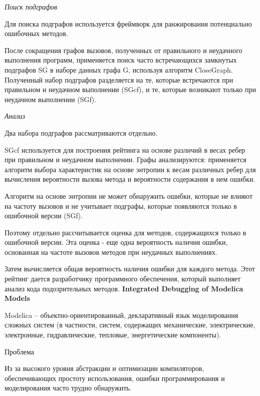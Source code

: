 \textit{Поиск подграфов}

Для поиска подграфов используется фреймворк для ранжирования потенциально ошибочных методов.

После сокращения графов вызовов, полученных от правильного и неудачного выполнения программ, применяется поиск часто встречающихся замкнутых подграфов SG в наборе данных графа G, используя алгоритм CloseGraph. Полученный набор подграфов разделяется на те, которые встречаются при правильном и неудачном выполнении (SGcf), и те, которые возникают только при неудачном выполнении (SGf).
\newline

\textit{Анализ}

Два набора подграфов рассматриваются отдельно.

SGcf используется для построения рейтинга на основе различий в весах ребер при правильном и неудачном выполнении. Графы анализируются: применяется алгоритм выбора характеристик на основе энтропии к весам различных ребер для вычисления вероятности вызова метода и вероятности содержания в нем ошибки.

Алгоритм на основе энтропии не может обнаружить ошибки, которые не влияют на частоту вызовов и не учитывает подграфы, которые появляются только в ошибочной версии (SGf).

Поэтому отдельно рассчитывается оценка для методов, содержащихся только в ошибочной версии. Эта оценка - еще одна вероятность наличия ошибки, основанная на частоте вызовов методов при неудачных выполнениях.

Затем вычисляется общая вероятность наличия ошибки для каждого метода. Этот рейтинг дается разработчику программного обеспечения, который выполняет анализ кода подозрительных методов.
\newline\newline
\textbf{Integrated Debugging of Modelica Models}
\newline

Modelica – объектно-ориентированный, декларативный язык моделирования сложных систем (в частности, систем, содержащих механические, электрические, электронные, гидравлические, тепловые, энергетические компоненты). 
\newline

Проблема

Из за высокого уровня абстракции и оптимизации компиляторов, обеспечивающих простоту использования, ошибки программирования и моделирования часто трудно обнаружить.
\newline

